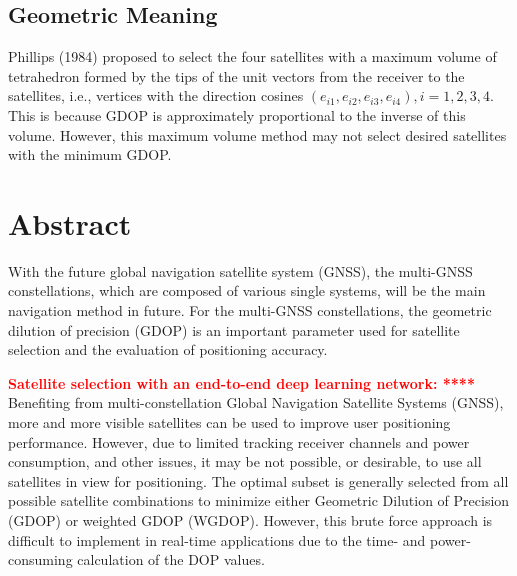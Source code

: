 \documentclass[a4paper]{report}
\begin{document}
\subsection{Geometric Meaning}
Phillips (1984) proposed to select the four satellites with a
maximum volume of tetrahedron formed by the tips of the
unit vectors from the receiver to the satellites, i.e., vertices
with the direction cosines $(e_{i1}, e_{i2}, e_{i3}, e_{i4}), i = 1, 2, 3, 4$. This
is because GDOP is approximately proportional to the inverse of this volume. However, this maximum volume method may not select desired satellites with the minimum GDOP. 

\section{Abstract}
With the future global navigation satellite system (GNSS), the multi-GNSS constellations, which are composed of various single systems, will be the main navigation method in future. For the multi-GNSS constellations, the geometric dilution of precision (GDOP) is an important parameter used for satellite selection and the evaluation of positioning accuracy.

\textcolor{red}{\textbf{Satellite selection with an end-to-end deep learning network: ****}}
Benefiting from multi-constellation Global Navigation Satellite Systems (GNSS), more and more visible satellites can be used to improve user positioning performance. However, due to limited tracking receiver channels and power consumption, and other issues, it may be not possible, or desirable, to use all satellites in view for positioning. The optimal subset is generally selected from all possible satellite combinations to minimize either Geometric Dilution of Precision (GDOP) or weighted GDOP (WGDOP). However, this brute force approach is difficult to implement in real-time applications due to the time- and power-consuming calculation of the DOP values.
\end{document}
